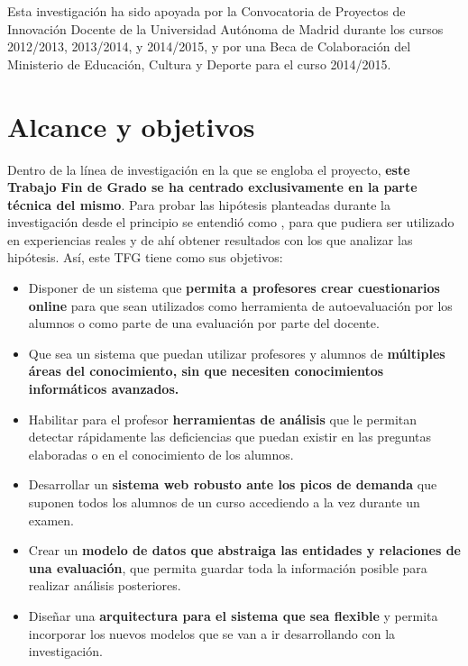 Esta investigación ha sido apoyada por la Convocatoria de Proyectos de Innovación Docente de la Universidad Autónoma de Madrid durante los cursos 2012/2013, 2013/2014, y 2014/2015, y por una Beca de Colaboración del Ministerio de Educación, Cultura y Deporte para el curso 2014/2015.

\section{Alcance y objetivos}


Dentro de la línea de investigación en la que se engloba el proyecto, \textbf{este Trabajo Fin de Grado se ha centrado exclusivamente en la parte técnica del mismo}. Para probar las hipótesis planteadas durante la investigación desde el principio se entendió como , para que pudiera ser utilizado en experiencias reales y de ahí obtener resultados con los que analizar las hipótesis. Así, este TFG tiene como sus objetivos:

\begin{itemize}
	\item Disponer de un sistema que \textbf{permita a profesores crear cuestionarios online} para que sean utilizados como herramienta de autoevaluación por los alumnos o como parte de una evaluación por parte del docente.
	\item Que sea un sistema que puedan utilizar profesores y alumnos de \textbf{múltiples áreas del conocimiento, sin que necesiten conocimientos informáticos avanzados.}
	\item Habilitar para el profesor \textbf{herramientas de análisis} que le permitan detectar rápidamente las deficiencias que puedan existir en las preguntas  elaboradas o en el conocimiento de los alumnos.
	\item Desarrollar un \textbf{sistema web robusto ante los picos de demanda} que suponen todos los alumnos de un curso accediendo a la vez durante un examen.
	\item Crear un \textbf{modelo de datos que abstraiga las entidades y relaciones de una evaluación}, que permita guardar toda la información posible para realizar análisis posteriores.
	\item Diseñar una \textbf{arquitectura para el sistema que sea flexible} y permita incorporar los nuevos modelos que se van a ir desarrollando con la investigación.
\end{itemize}

